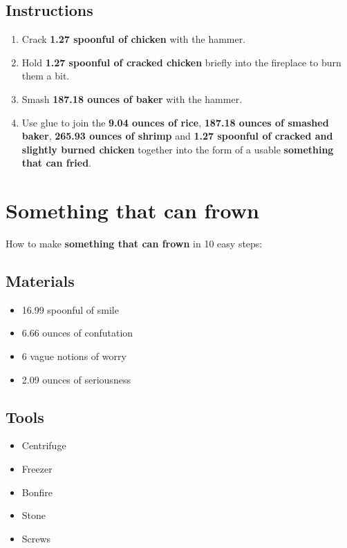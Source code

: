 \documentclass{article}
\begin{document}
\subsection{Instructions}\begin{enumerate}
\item 
Crack \textbf{1.27 spoonful of chicken} with the hammer.
\item 
Hold \textbf{1.27 spoonful of cracked chicken} briefly into the fireplace to burn them a bit.
\item 
Smash \textbf{187.18 ounces of baker} with the hammer.
\item 
Use glue to join the \textbf{9.04 ounces of rice}, \textbf{187.18 ounces of smashed baker}, \textbf{265.93 ounces of shrimp} and \textbf{1.27 spoonful of cracked and slightly burned chicken} together into the form of a usable \textbf{something that can fried}.
\end{enumerate}
\newpage
\section{Something that can frown}How to make \textbf{something that can frown} in 10 easy steps:

\subsection{Materials}\begin{itemize}
\item 
16.99 spoonful of smile
\item 
6.66 ounces of confutation
\item 
6 vague notions of worry
\item 
2.09 ounces of seriousness
\end{itemize}
\subsection{Tools}\begin{itemize}
\item 
Centrifuge
\item 
Freezer
\item 
Bonfire
\item 
Stone
\item 
Screws
\end{itemize}
\end{document}
